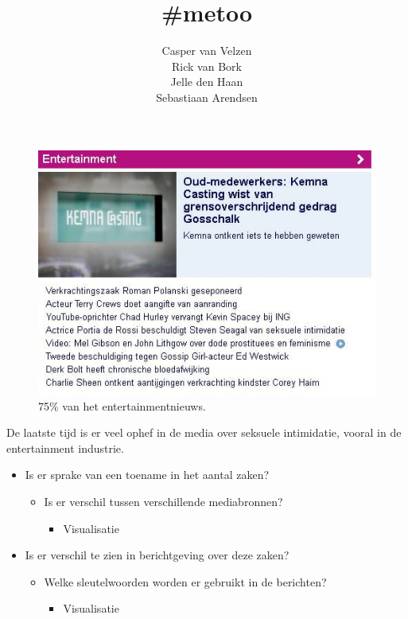 \documentclass[a4paper]{scrartcl}
\title{\#metoo}
\subtitle{}
\author{Casper van Velzen\\Rick van Bork\\Jelle den Haan\\Sebastiaan Arendsen}
\begin{document}
\maketitle
\thispagestyle{empty}
\begin{figure}[h!]
    \begin{center}
        \includegraphics[scale=0.4]{nu.jpg}
    \end{center}
    \caption{75\% van het entertainmentnieuws.}
\end{figure}
De laatste tijd is er veel ophef in de media over seksuele intimidatie, vooral in de entertainment industrie.
\begin{itemize}
    \item Is er sprake van een toename in het aantal zaken?
        \begin{itemize}
            \item Is er verschil tussen verschillende mediabronnen?
            \begin{itemize}
                \item Visualisatie
            \end{itemize}
        \end{itemize}
    \item Is er verschil te zien in berichtgeving over deze zaken?
    \begin{itemize}
        \item Welke sleutelwoorden worden er gebruikt in de berichten?
            \begin{itemize}
                \item Visualisatie
            \end{itemize}
    \end{itemize}
\end{itemize}
\end{document}
